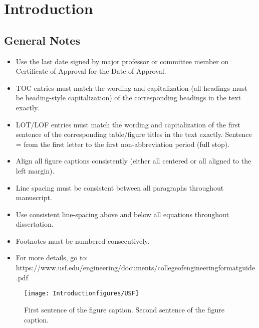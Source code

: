\chapter{Introduction}



\section{General Notes}
\begin{itemize}

\item Use the last date signed by major professor or committee member on Certificate of Approval for the Date of Approval.
   

\item TOC entries must match the wording and capitalization (all headings must be heading-style capitalization) of the corresponding headings in the text exactly. 

\item LOT/LOF entries must match the wording and capitalization of the first sentence of the corresponding table/figure titles in the text exactly. Sentence = from the first letter to the first non-abbreviation period (full stop).


\item Align all figure captions consistently (either all centered or all aligned to the left margin). 

\item Line spacing must be consistent between all paragraphs throughout manuscript.

\item Use consistent line-spacing above and below all equations throughout dissertation.

\item Footnotes must be numbered consecutively. 

\item For more details, go to: \\
https://www.usf.edu/engineering/documents/collegeofengineeringformatguide.pdf

 \end{itemize}




\begin{figure}[ht!]
\begin{center}
\texttt{[image: Introductionfigures/USF]}
\end{center}
\caption[Dynamic Materials Test System (858 Table Top System, MTS Systems Corporation, Eden Prairie, MN, USA) ]
{First sentence of the figure caption. Second sentence of the figure caption. }%
\label{fig2_Intro}
\end{figure}






